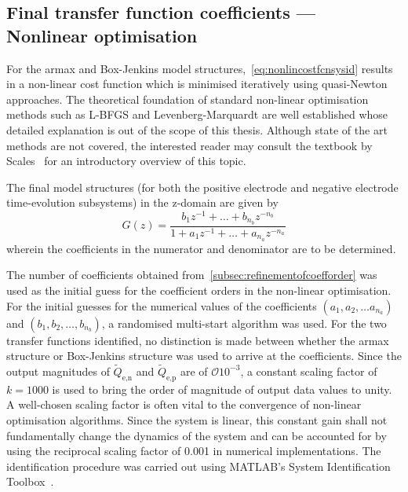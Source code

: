 \subsection{Final transfer function coefficients --- Nonlinear optimisation}

For         the         \gls{armax}        and         Box-Jenkins         model
structures,~\cref{eq:nonlincostfcnsysid} results  in a non-linear  cost function
which  is  minimised iteratively  using  quasi-Newton  approaches. The  theoretical
foundation  of  standard non-linear  optimisation  methods  such as  L-BFGS  and
Levenberg-Marquardt are  well established whose  detailed explanation is  out of
the scope of this thesis. Although state of the art methods are not covered, the
interested reader  may consult the  textbook by Scales~\cite{Scales1985}  for an
introductory overview of this topic.

The  final  model structures  (for  both  the  positive electrode  and  negative
electrode time-evolution subsystems) in the z-domain are given by
\begin{equation}
    G(z) = \frac{b_1z^{-1} + \dots + b_{n_b}z^{-{n_b}}}{1 + a_1z^{-1} + \dots + a_{n_a}z^{-{n_a}}}\label{eq:genericZtf}
\end{equation}
wherein the coefficients in the numerator and denominator are to be determined.

The  number of  coefficients obtained  from~\cref{subsec:refinementofcoefforder}
was  used as  the initial  guess for  the coefficient  orders in  the non-linear
optimisation.  For  the  initial  guesses   for  the  numerical  values  of  the
coefficients $(a_1, a_2,  \dots a_{n_a})$ and $(b_1, b_2, \dots  , b_{n_b} )$, a
randomised  multi-start  algorithm was  used.  For  the two  transfer  functions
identified, no distinction is made  between whether the \gls{armax} structure or
Box-Jenkins structure was  used to arrive at the coefficients.  Since the output
magnitudes of $\widetilde{Q}_{\text{e,n}}$  and $\widetilde{Q}_{\text{e,p}}$ are
of  $\mathcal{O}{10^{-3}}$,  a  constant  scaling   factor  of  $k  =  1000$  is
used  to  bring the  order  of  magnitude of  output  data  values to  unity.  A
well-chosen  scaling factor  is often  vital  to the  convergence of  non-linear
optimisation algorithms.  Since the system  is linear, this constant  gain shall
not fundamentally change the dynamics of the  system and can be accounted for by
using the reciprocal  scaling factor of 0.001 in  numerical implementations. The
identification procedure  was carried  out using MATLAB's  System Identification
Toolbox~\cite{matlabsysidtool}.

